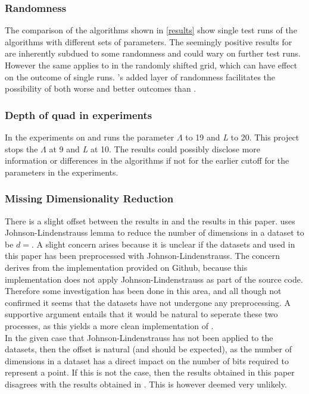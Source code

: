 \subsubsection{Randomness}
\label{disc/threats/randomness}
The comparison of the algorithms shown in \ref{results} show single test runs of the algorithms with different sets of parameters. The seemingly positive results for \qsr{} are inherently subdued to some randomness and could wary on further test runs. However the same applies to \qs{} in the randomly shifted grid, which can have effect on the outcome of single runs. \qsr{}'s added layer of randomness facilitates the possibility of both worse and better outcomes than \qs{}.

\subsubsection{Depth of quad in experiments}
In \cite{wagner17} the experiments on \qs{} and \grid{} runs the parameter $\Lambda$ to 19 and \textit{L} to 20. This project stops the $\Lambda$ at 9 and \textit{L} at 10. The results could possibly disclose more information or differences in the algorithms if not for the earlier cutoff for the parameters in the experiments.

\subsubsection{Missing Dimensionality Reduction}
There is a slight offset between the results in \cite{wagner17} and the results in this paper. \cite{wagner17} uses Johnson-Lindenstrauss lemma to reduce the number of dimensions in a dataset to be $d=$. A slight concern arises because it is unclear if the datasets \mnist{} and \sift{} used in this paper has been preprocessed with Johnson-Lindenstrauss. The concern derives from the \qs{} implementation provided on Github, because this implementation does not apply Johnson-Lindenstrauss as part of the source code. Therefore some investigation has been done in this area, and all though not confirmed it seems that the datasets have not undergone any preprocessing. A supportive argument entails that it would be natural to seperate these two processes, as this yields a more clean implementation of \qs{}. 
\\
In the given case that Johnson-Lindenstrauss has not been applied to the datasets, then the offset is natural (and should be expected), as the number of dimensions in a dataset has a direct impact on the number of bits required to represent a point. If this is not the case, then the results obtained in this paper disagrees with the results obtained in \cite{wagner17}. This is however deemed very unlikely. 